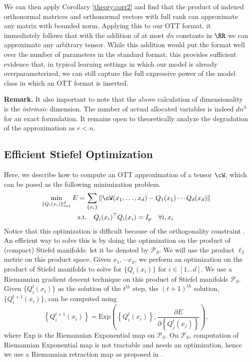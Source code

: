 We can then apply Corollary \ref{theory:corr2} and find that the product of indexed orthonormal matrices and orthonormal vectors with full rank can approximate any matrix with bounded norm. 
Applying this to our OTT format, it immediately follows that with  the addition of at most $dn$ constants in $\RR$ we can approximate any arbitrary tensor. While this addition would put the format well over the number of parameters in the standard format, this provides sufficient evidence that, in typical learning settings in which our model is already overparameterized, we can still capture the full expressive power of the model class in which an OTT format is inserted. 

{\bf Remark.} It also important to note that the above calculation of dimensionality is the \textit{intrinsic} dimension. The number of actual allocated variables is indeed $dn^3$ for an exact formulation.
It remains open to theoretically analyze the degradation of the approximation as $r<n$.

\subsection{Efficient Stiefel Optimization}\label{sec:opt}
Here, we describe how to compute an OTT approximation of a tensor $\cW$, which can be posed as the following minimization problem.
\vspace{-5pt}
\begin{align}
\min_{\left\{Q_i(x_i)\right\}_{i=1}^d} E &= \sum_{\left\{x_i\right\}} \|\cW(x_1,\ldots,x_d) - Q_1(x_1)\cdots Q_d(x_d)\| \notag \\ \quad & \mbox{s.t.} \quad Q_i(x_i)^\top Q_i(x_i) = I_p \quad \forall i, x_i
\end{align}
Notice that this optimization is difficult because of the orthogonality constraint \cite{edelman1998geometry,collins2014spectral}. An efficient way to solve this is by doing the optimization on the product of (compact) Stiefel manifolds: let it be denoted by $\mathcal{P}_S$. We will use the product $\ell_2$ metric on this product space. Given $x_1, \cdots x_d$, we perform
an optimization on the product of Stiefel manifolds to solve for $\{Q_i(x_i)\}$ for $i\in[1\ldots d]$. We use a Riemannian gradient descent technique on this product of Stiefel manifolds $\mathcal{P}_S$. Given $\{Q^t_i(x_i)\}$ as the solution of the $t^{th}$ step, the $(t+1)^{th}$ solution, $\{Q^{t+1}_i(x_i)\}$, can be computed using 
\vspace{-5pt}
\begin{equation}
\left\{Q^{t+1}_i(x_i)\right\} = \text{Exp}\left(\left\{Q^{t}_i(x_i)\right\}, \frac{\partial E}{\partial \left\{Q^{t}_j(x_j)\right\}}\right),
\end{equation}
where $\text{Exp}$ is the Riemannian Exponential map on $\mathcal{P}_S$. On $\mathcal{P}_S$, computation of Riemannian Exponential map is not tractable and needs an optimization, hence we
use a Riemannian retraction map as proposed in \cite{6340355}.

